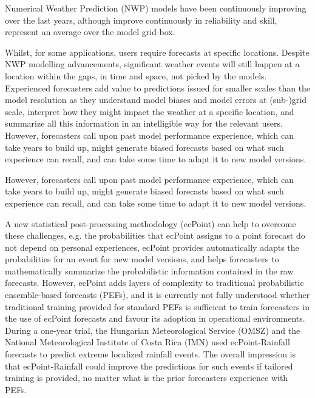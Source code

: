 Numerical Weather Prediction (NWP) models have been continuously improving over the last years,  although improve continuously in reliability and skill, represent an average over the model grid-box. 

Whilst, for some applications, users require forecasts at specific locations. Despite NWP modelling advancements, significant weather events will still happen at a location within the gaps, in time and space, not picked by the models. Experienced forecasters add value to predictions issued for smaller scales than the model resolution as they understand model biases and model errors at (sub-)grid scale, interpret how they might impact the weather at a specific location, and summarize all this information in an intelligible way for the relevant users. 
However, forecasters call upon past model performance experience, which can take years to build up, might generate biased forecasts based on what such experience can recall, and can take some time to adapt it to new model versions. 

However, forecasters call upon past model performance experience, which can take years to build up, might generate biased forecasts based on what such experience can recall, and can take some time to adapt it to new model versions. 

A new statistical post-processing methodology (ecPoint) can help to overcome these challenges, e.g. the probabilities that ecPoint assigns to a point forecast do not depend on personal experiences, ecPoint provides automatically adapts the probabilities for an event for new model versions, and helps forecasters to mathematically summarize the probabilistic information contained in the raw forecasts. However, ecPoint adds layers of complexity to traditional probabilistic ensemble-based forecasts (PEFs), and it is currently not fully understood whether traditional training provided for standard PEFs is sufficient to train forecasters in the use of ecPoint forecasts and favour its adoption in operational environments. During a one-year trial, the Hungarian Meteorological Service (OMSZ) and the National Meteorological Institute of Costa Rica (IMN) used ecPoint-Rainfall forecasts to predict extreme localized rainfall events. The overall impression is that ecPoint-Rainfall could improve the predictions for such events if tailored training is provided, no matter what is the prior forecasters experience with PEFs.

